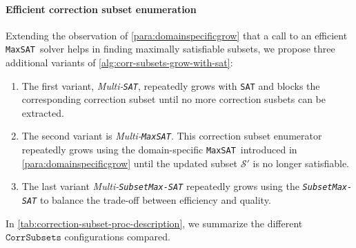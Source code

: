 \documentclass[twoside,11pt]{article}
\newcommand\m[1]{\mathcal{#1}}
\newcommand\comment[1]{\marginpar{\tiny #1}}
\renewcommand\comment[1]{#1}
\newcommand{\tias}[1]{{\comment{\color{blue}Tias:#1}}}
\newcommand{\emilio}[1]{{\comment{\color{red}Emilio: #1}}}
\newcommand{\bart}[1]{{\comment{\color{OliveGreen}Bart: #1}}}
\newcommand\mm[1]{\ensuremath{#1}\xspace}
\newcommand\call[1]{\mm{\texttt{#1}}}
\newcommand\sat{\texttt{{SAT}}\xspace}
\newcommand\subsetmaxsat{\texttt{SubsetMax-SAT}}
\newcommand\grow{\mm{\call{Grow}}}
\newcommand\corrsubsets{\mm{\call{CorrSubsets}}}
\newcommand\maxsat{\texttt{MaxSAT}}
\newcommand\domspecmaxsat{\texttt{Dom.-spec.}~\texttt{MaxSAT}}
\begin{document}
\paragraph{Efficient correction subset enumeration} 
Extending the observation of \cref{para:domainspecificgrow} that a call to an efficient \maxsat~solver helps in finding maximally satisfiable subsets, we propose three additional variants of \cref{alg:corr-subsets-grow-with-sat}:
\begin{enumerate}
	\item The first variant, \emph{Multi-\sat}, repeatedly grows with \sat and blocks the corresponding correction subset until no more correction susbets can be extracted.
	\item The second variant is \emph{Multi-\maxsat}. This correction subset enumerator repeatedly grows using the domain-specific \maxsat~introduced in \cref{para:domainspecificgrow} until the updated subset $\m{S}'$ is no longer satisfiable. 
	\item The last variant \emph{Multi-\subsetmaxsat} repeatedly grows using the \emph{\subsetmaxsat} to balance the trade-off between efficiency and quality.
\end{enumerate}
In \cref{tab:correction-subset-proc-description}, we summarize the different \corrsubsets configurations compared.
%
\end{document}
